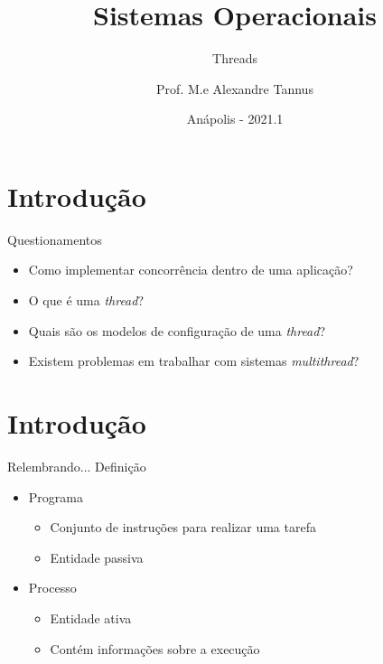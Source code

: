 \documentclass[aspectratio=169,
				xcolor=table]{beamer}
\institute[]{\uppercase{Engenharia de Software}}
\title[]{Sistemas Operacionais}
\subtitle[]{Threads}
\author[]{Prof. M.e Alexandre Tannus}
\date{Anápolis - 2021.1}
\begin{document}
	\begin{frame}
		\titlepage
	\end{frame}

	\begin{frame}
		\tableofcontents
	\end{frame}	
	
	\section{Introdução}
	
	\begin{frame}{Questionamentos}
		\begin{itemize}
			\item Como implementar concorrência dentro de uma aplicação?
			\vspace{1em}
			\item O que é uma \textit{thread}?
			\vspace{1em}
			\item Quais são os modelos de configuração de uma \textit{thread}?
			\vspace{1em}
			\item Existem problemas em trabalhar com sistemas \textit{multithread}?
		\end{itemize}
	\end{frame}

	\section{Introdução}
	\begin{frame}{Relembrando...}
		\alert{\Large Definição}
		\begin{itemize}
			\item Programa
			\begin{itemize}
				\item Conjunto de instruções para realizar uma tarefa
				\item Entidade passiva
			\end{itemize}
			\vspace{1em}
			\item Processo
			\begin{itemize}
				\item Entidade ativa
				\item Contém informações sobre a execução
			\end{itemize}
		\end{itemize}
	\end{frame}
	
\end{document}
